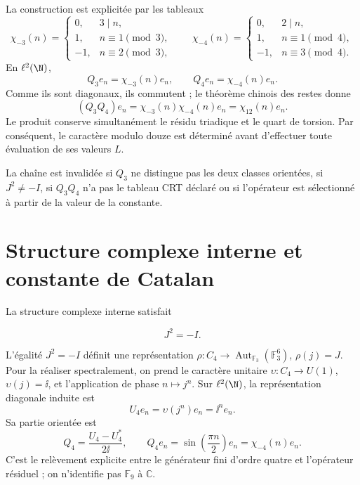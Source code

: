 La construction est explicitée par les tableaux
\begin{equation}
\chi_{-3}(n)=
\begin{cases}
0,&3\mid n,\\
1,&n\equiv1\pmod3,\\
-1,&n\equiv2\pmod3,
\end{cases}
\qquad
\chi_{-4}(n)=
\begin{cases}
0,&2\mid n,\\
1,&n\equiv1\pmod4,\\
-1,&n\equiv3\pmod4.
\end{cases}
\label{eq:characters34-tables}
\end{equation}
En \(\ell^2(\N)\),
\[
Q_3e_n=\chi_{-3}(n)e_n,
\qquad Q_4e_n=\chi_{-4}(n)e_n.
\]
Comme ils sont diagonaux, ils commutent ; le théorème chinois des restes donne
\begin{equation}
(Q_3Q_4)e_n=\chi_{-3}(n)\chi_{-4}(n)e_n
=\chi_{12}(n)e_n.
\label{eq:q12-product-proof}
\end{equation}
Le produit conserve simultanément le résidu triadique et le quart de
torsion. Par conséquent, le caractère modulo douze est déterminé
avant d'effectuer toute évaluation de ses valeurs \(L\).

\begin{remark}
La chaîne est invalidée si \(Q_3\) ne distingue pas les deux classes orientées,
si \(J^2\ne-I\), si \(Q_3Q_4\) n'a pas le tableau CRT déclaré ou si
l'opérateur est sélectionné à partir de la valeur de la constante.
\end{remark}

\section{Structure complexe interne et constante de Catalan}

La structure complexe interne satisfait

\begin{equation}
J^2=-I.
\label{eq:J-square}
\end{equation}

L'égalité \(J^2=-I\) définit une représentation
\(\rho:C_4\to\operatorname{Aut}_{\mathbb F_3}(\mathbb F_3^6)\),
\(\rho(j)=J\). Pour la réaliser spectralement, on prend le caractère unitaire
\(\upsilon:C_4\to U(1)\), \(\upsilon(j)=\ii\), et l'application de phase
\(n\mapsto j^n\). Sur \(\ell^2(\N)\), la représentation diagonale induite
est
\[
U_4e_n=\upsilon(j^n)e_n=\ii^ne_n.
\]
Sa partie orientée est
\[
Q_4=\frac{U_4-U_4^*}{2\ii},\qquad
Q_4e_n=\sin\!\left(\frac{\pi n}{2}\right)e_n
=\chi_{-4}(n)e_n.
\]
C'est le relèvement explicite entre le générateur fini d'ordre quatre et l'opérateur
résiduel ; on n'identifie pas \(\mathbb F_9\) à \(\mathbb C\).

